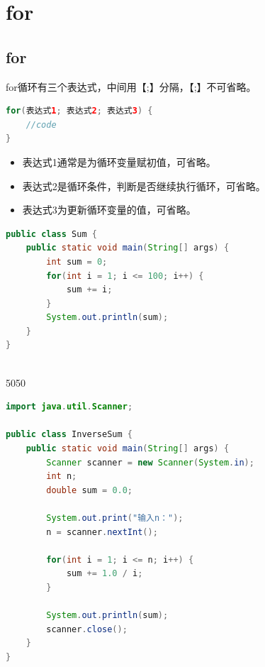 \newpage

\section{for}

\subsection{for}

for循环有三个表达式，中间用【;】分隔，【;】不可省略。

\vspace{-0.5cm}

\begin{lstlisting}[language=Java]
for(表达式1; 表达式2; 表达式3) {
    //code
}
\end{lstlisting}

\begin{itemize}
	\item 表达式1通常是为循环变量赋初值，可省略。
	\item 表达式2是循环条件，判断是否继续执行循环，可省略。
	\item 表达式3为更新循环变量的值，可省略。
\end{itemize}

\vspace{0.5cm}


\begin{lstlisting}[language=Java]
public class Sum {
    public static void main(String[] args) {
        int sum = 0;
        for(int i = 1; i <= 100; i++) {
            sum += i;
        }
        System.out.println(sum);
    }
}
\end{lstlisting}

\begin{tcolorbox}
	 \\
	5050
\end{tcolorbox}

\vspace{0.5cm}


\begin{lstlisting}[language=Java]
import java.util.Scanner;

public class InverseSum {
    public static void main(String[] args) {
        Scanner scanner = new Scanner(System.in);
        int n;
        double sum = 0.0;
        
        System.out.print("输入n：");
        n = scanner.nextInt();
        
        for(int i = 1; i <= n; i++) {
            sum += 1.0 / i;
        }
        
        System.out.println(sum);
        scanner.close();
    }
}
\end{lstlisting}

